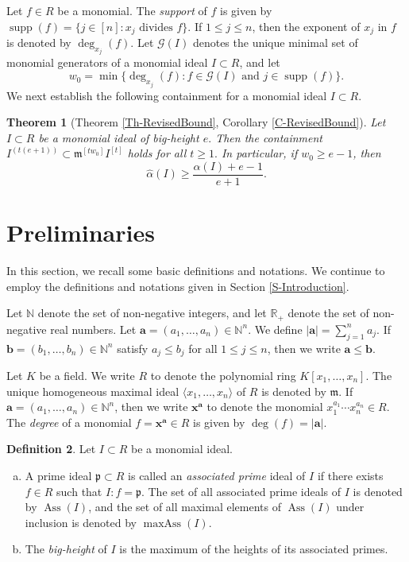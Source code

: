 \documentclass[12pt,reqno]{amsart}
\newtheorem{thm}{Theorem}[section]
\theoremstyle{definition}
\newtheorem{defn}[thm]{Definition}
\DeclareMathOperator{\Ass}{Ass}
\DeclareMathOperator{\maxAss}{maxAss}
\newcommand{\mi}{\mathfrak{m}}
\newcommand{\p}{\mathfrak{p}}
\newcommand{\RR}{\mathbb{R}}
\newcommand{\x}{\mathbf{x}}
\newcommand{\ba}{\mathbf{a}}
\newcommand{\bb}{\mathbf{b}}
\newcommand{\supp}[1]{\operatorname{supp}\left(#1\right)}
\newcommand{\ww}{\widehat{\alpha}}
\newcommand{\N}{\mathbb{N}}
\numberwithin{equation}{section}
\begin{document}
Let $f \in R$ be a monomial. The \textit{support} of $f$ is given by $\supp{f} = \{j \in [n] : x_j \text{ divides } f\}.$ If $1 \le j \le n$, then the exponent of $x_j$ in $f$ is denoted by $\deg_{x_j}(f).$ Let $\mathcal{G}(I)$ denotes the unique minimal set of monomial generators of a monomial ideal $I \subset R$, and let 
\[w_0 = \min\{\deg_{x_j}(f) : f \in \mathcal{G}(I) \text{ and } j \in \supp f\}.\] 
We next establish the following containment for a monomial ideal $I \subset R.$

\begin{thm}[Theorem \ref{Th-RevisedBound}, Corollary \ref{C-RevisedBound}]
    Let $I \subset R$ be a monomial ideal of big-height $e.$ Then the containment 
    $I^{(t(e + 1))} \subset \mi^{[tw_0]} I^{[t]}$ holds for all $t \ge 1.$ In particular, if $w_0 \ge e - 1$, then 
    \[\ww(I) \ge \dfrac{\alpha(I) + e - 1}{e + 1}.\]
\end{thm}

\section{Preliminaries}

In this section, we recall some basic definitions and notations. We continue to employ the definitions and notations given in Section \ref{S-Introduction}.

Let $\N$ denote the set of non-negative integers, and let $\RR_{+}$ denote the set of non-negative real numbers. Let $\ba = (a_1, \ldots, a_n) \in \N^n.$ We define $|\ba| = \sum_{j = 1}^{n} a_j.$ If $\bb = (b_1, \ldots, b_n) \in \N^n$ satisfy $a_j \le b_j$ for all $1 \le j \le n$, then we write $\ba \le \bb.$

Let $K$ be a field. We write $R$ to denote the polynomial ring $K[x_1,\ldots,x_n].$ The unique homogeneous maximal ideal $\langle x_1, \ldots, x_n \rangle$ of $R$ is denoted by $\mi.$ If $\ba = (a_1, \ldots, a_n) \in \N^n$, then we write $\x^{\ba}$ to denote the monomial $x_1^{a_1} \cdots x_n^{a_n} \in R.$ The \textit{degree} of a monomial $f = \x^{\ba} \in R$ is given by $\deg(f) = |\ba|.$

\begin{defn}
    Let $I \subset R$ be a monomial ideal. 
    \begin{enumerate}[(a)]
        \item A prime ideal $\p \subset R$ is called an \textit{associated prime} ideal of $I$ if there exists $f \in R$ such that $I : f = \p.$ The set of all associated prime ideals of $I$ is denoted by $\Ass(I)$, and the set of all maximal elements of $\Ass(I)$ under inclusion is denoted by $\maxAss(I).$

        \item The \textit{big-height} of $I$ is the maximum of the heights of its associated primes.

    \end{enumerate}
\end{defn}
\end{document}
